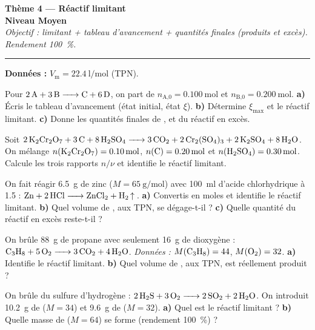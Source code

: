 \documentclass[11pt,a4paper]{article}
\newcommand{\nq}[1]{n_{\text{#1}}}
\newcommand{\Vm}{V_{\mathrm m}}
\begin{document}
\begin{center}
{\LARGE\bfseries\color{primarydark}Thème 4 — Réactif limitant}\\[1pt]
{\large\color{moycol}\textbf{Niveau Moyen}}\\[2pt]
{\itshape Objectif : limitant + tableau d'avancement + quantités finales (produits et excès). Rendement \SI{100}{\percent}.}\\
{\color{primary}\rule{0.64\linewidth}{1pt}}
\end{center}

\textbf{Données :} $\Vm=\SI{22,4}{\litre\per\mole}$ (TPN).

\begin{exo}
Pour $\ce{2 A + 3 B -> C + 6 D}$, on part de $\nq{A,0}=\SI{0,100}{\mole}$ et $\nq{B,0}=\SI{0,200}{\mole}$.
\textbf{a)} Écris le tableau d'avancement (état initial, état $\xi$).\quad
\textbf{b)} Détermine $\xi_{\max}$ et le réactif limitant.\quad
\textbf{c)} Donne les quantités finales de ,  et du réactif en excès.
\end{exo}

\begin{exo}
Soit $\ce{2 K2Cr2O7 + 3 C + 8 H2SO4 -> 3 CO2 + 2 Cr2(SO4)3 + 2 K2SO4 + 8 H2O}$.
On mélange $n(\ce{K2Cr2O7})=\SI{0,10}{\mole}$, $n(\ce{C})=\SI{0,20}{\mole}$ et
$n(\ce{H2SO4})=\SI{0,30}{\mole}$.
Calcule les trois rapports $n/\nu$ et identifie le réactif limitant.
\end{exo}

\begin{exo}
On fait réagir \SI{6,5}{\gram} de zinc ($M=\SI{65}{\gram\per\mole}$) avec \SI{100}{\milli\litre}
d'acide chlorhydrique à \SI{1,5}{\Molar} : $\ce{Zn + 2 HCl -> ZnCl2 + H2 ^}$.
\textbf{a)} Convertis en moles et identifie le réactif limitant.\quad
\textbf{b)} Quel volume de , aux TPN, se dégage-t-il ?\quad
\textbf{c)} Quelle quantité du réactif en excès reste-t-il ?
\end{exo}

\begin{exo}
On brûle \SI{88}{\gram} de propane avec seulement \SI{16}{\gram} de dioxygène :
$\ce{C3H8 + 5 O2 -> 3 CO2 + 4 H2O}$.
\emph{Données :} $M(\ce{C3H8})=44$, $M(\ce{O2})=32$.
\textbf{a)} Identifie le réactif limitant.\quad
\textbf{b)} Quel volume de , aux TPN, est réellement produit ?
\end{exo}

\begin{exo}
On brûle du sulfure d'hydrogène : $\ce{2 H2S + 3 O2 -> 2 SO2 + 2 H2O}$. On introduit
\SI{10,2}{\gram} de  ($M=34$) et \SI{9,6}{\gram} de  ($M=32$).
\textbf{a)} Quel est le réactif limitant ?\quad
\textbf{b)} Quelle masse de  ($M=64$) se forme (rendement \SI{100}{\percent}) ?
\end{exo}
\end{document}
